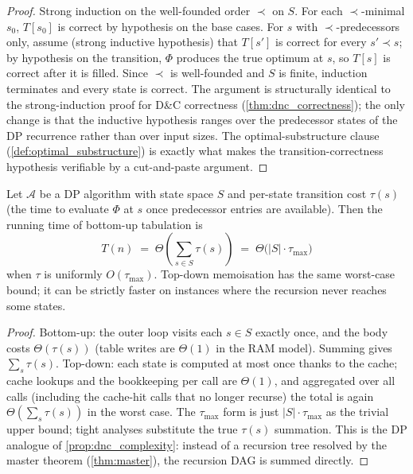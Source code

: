 \begin{proof}
\sketchproof Strong induction on the well-founded order $\prec$ on $S$. For each $\prec$-minimal $s_0$, $T[s_0]$ is correct by hypothesis on the base cases. For $s$ with $\prec$-predecessors only, assume (strong inductive hypothesis) that $T[s']$ is correct for every $s' \prec s$; by hypothesis on the transition, $\Phi$ produces the true optimum at $s$, so $T[s]$ is correct after it is filled. Since $\prec$ is well-founded and $S$ is finite, induction terminates and every state is correct. The argument is structurally identical to the strong-induction proof for D\&C correctness (\cref{thm:dnc_correctness}); the only change is that the inductive hypothesis ranges over the predecessor states of the DP recurrence rather than over input sizes. The optimal-substructure clause (\cref{def:optimal_substructure}) is exactly what makes the transition-correctness hypothesis verifiable by a cut-and-paste argument.
\end{proof}

\begin{proposition}
\label{prop:dp_time}
Let $\mathcal{A}$ be a DP algorithm with state space $S$ and per-state transition cost $\tau(s)$ (the time to evaluate $\Phi$ at $s$ once predecessor entries are available). Then the running time of bottom-up tabulation is
\[
  T(n) \;=\; \Theta\!\left(\sum_{s \in S} \tau(s)\right) \;=\; \Theta\bigl(|S| \cdot \tau_{\max}\bigr)
\]
when $\tau$ is uniformly $O(\tau_{\max})$. Top-down memoisation has the same worst-case bound; it can be strictly faster on instances where the recursion never reaches some states.
\end{proposition}

\begin{proof}
\sketchproof Bottom-up: the outer loop visits each $s \in S$ exactly once, and the body costs $\Theta(\tau(s))$ (table writes are $\Theta(1)$ in the RAM model). Summing gives $\sum_s \tau(s)$. Top-down: each state is computed at most once thanks to the cache; cache lookups and the bookkeeping per call are $\Theta(1)$, and aggregated over all calls (including the cache-hit calls that no longer recurse) the total is again $\Theta(\sum_s \tau(s))$ in the worst case. The $\tau_{\max}$ form is just $|S| \cdot \tau_{\max}$ as the trivial upper bound; tight analyses substitute the true $\tau(s)$ summation. This is the DP analogue of \cref{prop:dnc_complexity}: instead of a recursion tree resolved by the master theorem (\cref{thm:master}), the recursion DAG is summed directly.
\end{proof}

